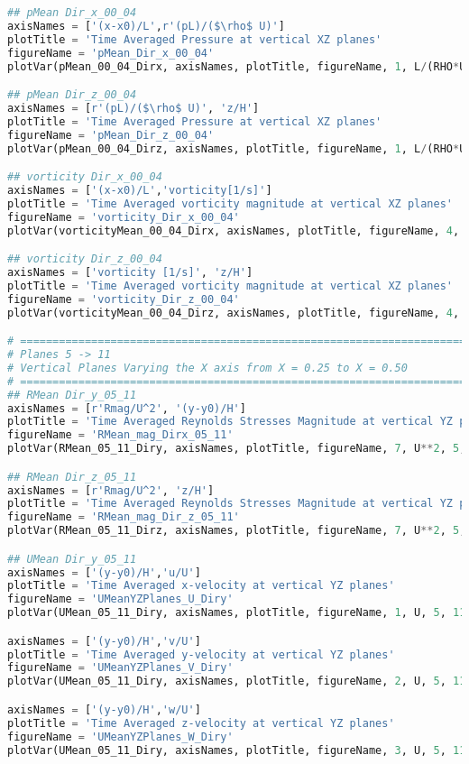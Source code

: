 \documentclass[../main.tex]{subfiles}
\begin{document}
\begin{lstlisting}[language=python]
## pMean Dir_x_00_04
axisNames = ['(x-x0)/L',r'(pL)/($\rho$ U)']
plotTitle = 'Time Averaged Pressure at vertical XZ planes'
figureName = 'pMean_Dir_x_00_04'
plotVar(pMean_00_04_Dirx, axisNames, plotTitle, figureName, 1, L/(RHO*U), 0, 4)

## pMean Dir_z_00_04
axisNames = [r'(pL)/($\rho$ U)', 'z/H']
plotTitle = 'Time Averaged Pressure at vertical XZ planes'
figureName = 'pMean_Dir_z_00_04'
plotVar(pMean_00_04_Dirz, axisNames, plotTitle, figureName, 1, L/(RHO*U), 0, 4)

## vorticity Dir_x_00_04
axisNames = ['(x-x0)/L','vorticity[1/s]']
plotTitle = 'Time Averaged vorticity magnitude at vertical XZ planes'
figureName = 'vorticity_Dir_x_00_04'
plotVar(vorticityMean_00_04_Dirx, axisNames, plotTitle, figureName, 4, 1, 0, 4)

## vorticity Dir_z_00_04
axisNames = ['vorticity [1/s]', 'z/H']
plotTitle = 'Time Averaged vorticity magnitude at vertical XZ planes'
figureName = 'vorticity_Dir_z_00_04'
plotVar(vorticityMean_00_04_Dirz, axisNames, plotTitle, figureName, 4, 1, 0, 4)

# =============================================================================
# Planes 5 -> 11
# Vertical Planes Varying the X axis from X = 0.25 to X = 0.50
# =============================================================================
## RMean Dir_y_05_11
axisNames = [r'Rmag/U^2', '(y-y0)/H']
plotTitle = 'Time Averaged Reynolds Stresses Magnitude at vertical YZ planes'
figureName = 'RMean_mag_Dirx_05_11'
plotVar(RMean_05_11_Diry, axisNames, plotTitle, figureName, 7, U**2, 5, 11)

## RMean Dir_z_05_11
axisNames = [r'Rmag/U^2', 'z/H']
plotTitle = 'Time Averaged Reynolds Stresses Magnitude at vertical YZ planes'
figureName = 'RMean_mag_Dir_z_05_11'
plotVar(RMean_05_11_Dirz, axisNames, plotTitle, figureName, 7, U**2, 5, 11)

## UMean Dir_y_05_11
axisNames = ['(y-y0)/H','u/U']
plotTitle = 'Time Averaged x-velocity at vertical YZ planes'
figureName = 'UMeanYZPlanes_U_Diry'
plotVar(UMean_05_11_Diry, axisNames, plotTitle, figureName, 1, U, 5, 11)

axisNames = ['(y-y0)/H','v/U']
plotTitle = 'Time Averaged y-velocity at vertical YZ planes'
figureName = 'UMeanYZPlanes_V_Diry'
plotVar(UMean_05_11_Diry, axisNames, plotTitle, figureName, 2, U, 5, 11)

axisNames = ['(y-y0)/H','w/U']
plotTitle = 'Time Averaged z-velocity at vertical YZ planes'
figureName = 'UMeanYZPlanes_W_Diry'
plotVar(UMean_05_11_Diry, axisNames, plotTitle, figureName, 3, U, 5, 11)


\end{lstlisting}
\end{document}
